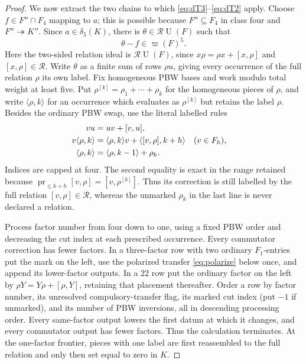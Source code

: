 \documentclass[10pt,a4paper]{amsart}
\theoremstyle{remark}
\newcommand{\U}{\operatorname U}
\newcommand{\aug}{\varpi}
\begin{document}
\begin{proof}
We now extract the two chains to which
\eqref{eq:dT3}--\eqref{eq:dT2} apply.  Choose
$f\in F''\cap F_4$ mapping to $a$; this is possible because
$F''\subseteq F_4$ in class four and $F''\twoheadrightarrow K''$.
Since $a\in\delta_5(K)$, there is
$\theta\in\mathcal R\U(F)$ such that
\begin{equation}
                         \theta-f\in\aug(F)^5.          \label{eq:witness}
\end{equation}
Here the two-sided relation ideal is $\mathcal R\U(F)$, since
$x\rho=\rho x+[x,\rho]$ and $[x,\rho]\in\mathcal R$.
Write $\theta$ as a finite sum of rows $\rho u$, giving every occurrence
of the full relation $\rho$ its own label.  Fix homogeneous PBW
bases and work modulo total weight at least five.  Put
$\rho^{[k]}=\rho_1+\cdots+\rho_k$ for the homogeneous pieces of
$\rho$, and write $\langle\rho,k\rangle$ for an occurrence which
evaluates as $\rho^{[k]}$ but retains the label $\rho$.  Besides the
ordinary PBW swap, use the literal labelled rules
\begin{align}
 vu&=uv+[v,u],\notag\\
 v\langle\rho,k\rangle
   &=\langle\rho,k\rangle v+
     \langle[v,\rho],k+h\rangle &&(v\in F_h),\notag\\
 \langle\rho,k\rangle
   &=\langle\rho,k-1\rangle+\rho_k .                  \label{eq:collect}
\end{align}
Indices are capped at four.  The second equality is exact in the
range retained because
$\operatorname {pr}_{\leq k+h}[v,\rho]=[v,\rho^{[k]}]$.
Thus its correction is still labelled by the full relation
$[v,\rho]\in\mathcal R$, whereas the unmarked $\rho_k$ in the last
line is never declared a relation.

Process factor number from four down to one, using a fixed PBW order
and decreasing the cut index at each prescribed occurrence.  Every
commutator correction has fewer factors.  In a three-factor row with two ordinary
$F_1$-entries put the mark on the left, use the polarized transfer
\eqref{eq:polarize} below once, and append its lower-factor outputs.
In a $22$ row put the
ordinary factor on the left by $\rho Y=Y\rho+[\rho,Y]$, retaining that
placement thereafter.  Order a row by factor number, its unresolved
compulsory-transfer flag, its marked cut index (put $-1$ if unmarked),
and its number of PBW inversions, all in descending processing order.
Every same-factor output lowers the first datum at which it changes,
and every commutator output has fewer factors.  Thus the calculation
terminates.  At the
one-factor frontier, pieces with one label are first reassembled to
the full relation and only then set equal to zero in $K$.


\end{proof}
\end{document}
